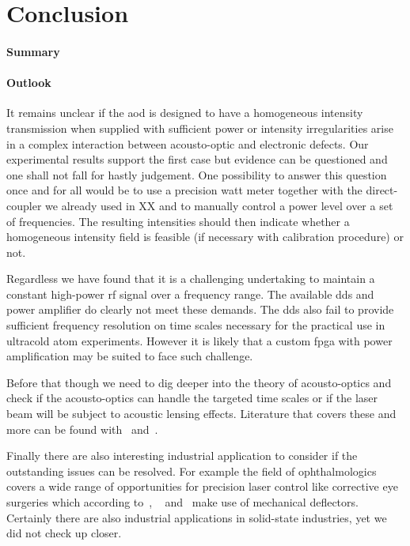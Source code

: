 \chapter{Conclusion}

\subsubsection{Summary}

\subsubsection{Outlook}

It remains unclear if the \gls{aod} is designed to have a homogeneous
intensity transmission when supplied with sufficient power or intensity
irregularities arise in a complex interaction between acousto-optic and
electronic defects. Our experimental results support the first case but
evidence can be questioned and one shall not fall for hastly judgement.
One possibility to answer this question once and for all would be to use a
precision watt meter together with the direct-coupler we already used in XX
and to manually control a power level over a set of frequencies. The
resulting intensities should then indicate whether a homogeneous intensity
field is feasible (if necessary with calibration procedure) or not.

Regardless we have found that it is a challenging undertaking to maintain a
constant high-power \gls{rf} signal over a frequency range. The available
\gls{dds} and power amplifier do clearly not meet these demands. The
\gls{dds} also fail to provide sufficient frequency resolution on time scales
necessary for the practical use in ultracold atom experiments. However it is
likely that a custom \gls{fpga} with power amplification may be suited to
face such challenge.

Before that though we need to dig deeper into the theory of acousto-optics
and check if the acousto-optics can handle the targeted time scales or if
the laser beam will be subject to acoustic lensing effects. Literature that
covers these and more can be found with~\cite{Goutzoulis1994}
and~\cite{Royer1999}.

Finally there are also interesting industrial application to consider if the
outstanding issues can be resolved. For example the field of ophthalmologics
covers a wide range of opportunities for precision laser control like
corrective eye surgeries which according to~\cite{US20180110655},
~\cite{US20180064579} and~\cite{US7131968} make use of mechanical deflectors.
Certainly there are also industrial applications in solid-state industries,
yet we did not check up closer.
